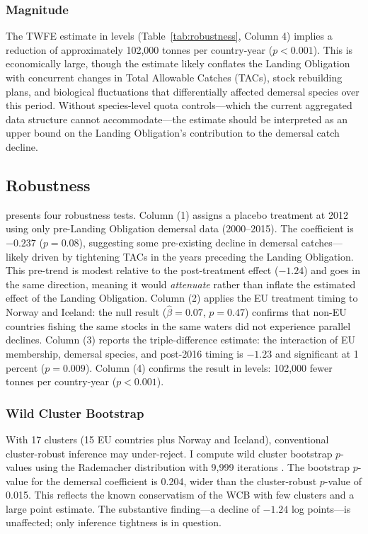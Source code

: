 \documentclass[12pt]{article}
\begin{document}
\subsubsection*{Magnitude} The TWFE estimate in levels (Table~\ref{tab:robustness}, Column 4) implies a reduction of approximately 102,000 tonnes per country-year ($p < 0.001$). This is economically large, though the estimate likely conflates the Landing Obligation with concurrent changes in Total Allowable Catches (TACs), stock rebuilding plans, and biological fluctuations that differentially affected demersal species over this period. Without species-level quota controls---which the current aggregated data structure cannot accommodate---the estimate should be interpreted as an upper bound on the Landing Obligation's contribution to the demersal catch decline.

\subsection{Robustness}



 presents four robustness tests. Column (1) assigns a placebo treatment at 2012 using only pre-Landing Obligation demersal data (2000--2015). The coefficient is $-0.237$ ($p = 0.08$), suggesting some pre-existing decline in demersal catches---likely driven by tightening TACs in the years preceding the Landing Obligation. This pre-trend is modest relative to the post-treatment effect ($-1.24$) and goes in the same direction, meaning it would \textit{attenuate} rather than inflate the estimated effect of the Landing Obligation. Column (2) applies the EU treatment timing to Norway and Iceland: the null result ($\hat{\beta} = 0.07$, $p = 0.47$) confirms that non-EU countries fishing the same stocks in the same waters did not experience parallel declines. Column (3) reports the triple-difference estimate: the interaction of EU membership, demersal species, and post-2016 timing is $-1.23$ and significant at 1 percent ($p = 0.009$). Column (4) confirms the result in levels: 102,000 fewer tonnes per country-year ($p < 0.001$).

\subsubsection*{Wild Cluster Bootstrap} With 17 clusters (15 EU countries plus Norway and Iceland), conventional cluster-robust inference may under-reject. I compute wild cluster bootstrap $p$-values using the Rademacher distribution with 9,999 iterations \citep{cameron2008bootstrap}. The bootstrap $p$-value for the demersal coefficient is 0.204, wider than the cluster-robust $p$-value of 0.015. This reflects the known conservatism of the WCB with few clusters and a large point estimate. The substantive finding---a decline of $-1.24$ log points---is unaffected; only inference tightness is in question.
\end{document}
